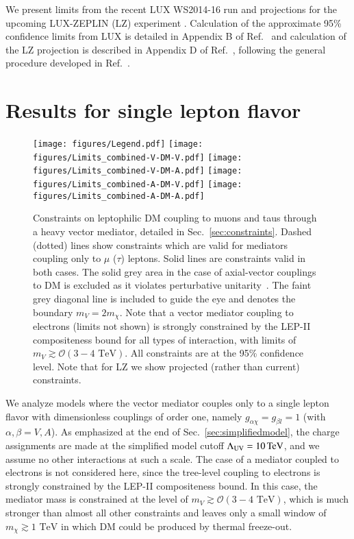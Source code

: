 \documentclass[final,5p,twocolumn]{elsarticle}
\begin{document}
We present limits from the recent LUX WS2014-16 run \cite{Akerib:2016vxi} and projections for the upcoming LUX-ZEPLIN (LZ) experiment \cite{Akerib:2015cja}. Calculation of the approximate 95\% confidence limits from LUX is detailed in Appendix B of Ref.~\cite{Kavanagh:2016pyr} and calculation of the LZ projection is described in Appendix D of Ref.~\cite{D'Eramo:2016atc}, following the general procedure developed in Ref.~\cite{DelNobile:2013sia}.

\section{Results for single lepton flavor}
\label{sec:results}

\begin{figure*}[t!]
\centering
\hspace{0.75cm}\texttt{[image: figures/Legend.pdf]}
{\texttt{[image: figures/Limits\_combined-V-DM-V.pdf]}}
{\texttt{[image: figures/Limits\_combined-V-DM-A.pdf]}}
{\texttt{[image: figures/Limits\_combined-A-DM-V.pdf]}}
{\texttt{[image: figures/Limits\_combined-A-DM-A.pdf]}}
\caption{Constraints on leptophilic DM coupling to muons and taus through a heavy vector mediator, detailed in Sec.~\ref{sec:constraints}. Dashed (dotted) lines show constraints which are valid for mediators coupling only to $\mu$ ($\tau$) leptons. Solid lines are constraints valid in both cases. The solid grey area in the case of axial-vector couplings to DM is excluded as it violates perturbative unitarity~\cite{Kahlhoefer:2015bea}. The faint grey diagonal line is included to guide the eye and denotes the boundary $m_V = 2 m_\chi$. Note that a vector mediator coupling to electrons (limits not shown) is strongly constrained by the LEP-II  compositeness bound \cite{LEP:2003aa} for all types of interaction, with limits of $m_V \gtrsim \mathcal{O}(3-4 \,\,\mathrm{TeV})$. All constraints are at the 95\% confidence level. Note that for LZ we show projected (rather than current) constraints.}
\label{fig:Limits}
\end{figure*}

We analyze models where the vector mediator couples only to a single lepton flavor with dimensionless couplings of order one, namely $g_{\alpha\chi} = g_{\beta l} = 1$ (with $\alpha, \beta = V, A$). As emphasized at the end of Sec.~\ref{sec:simplifiedmodel}, the charge assignments are made at the simplified model cutoff $\Lambda_{\rm UV} = 10 \, {\rm TeV}$, and we assume no other interactions at such a scale. The case of a mediator coupled to electrons is not considered here, since the tree-level coupling to electrons is strongly constrained by the LEP-II compositeness bound. In this case, the mediator mass is constrained at the level of $m_V \gtrsim \mathcal{O}(3-4 \,\,\mathrm{TeV})$, which is much stronger than almost all other constraints and leaves only a small window of $m_\chi \gtrsim 1 \,\, \mathrm{TeV}$ in which DM could be produced by thermal freeze-out. 
\end{document}
